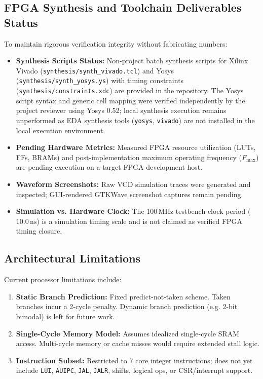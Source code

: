 \documentclass[conference]{IEEEtran}
\begin{document}
\subsection{FPGA Synthesis and Toolchain Deliverables Status}
To maintain rigorous verification integrity without fabricating numbers:
\begin{itemize}
    \item \textbf{Synthesis Scripts Status:} Non-project batch synthesis scripts for Xilinx Vivado (\texttt{synthesis/synth\_vivado.tcl}) and Yosys (\texttt{synthesis/synth\_yosys.ys}) with timing constraints (\texttt{synthesis/constraints.xdc}) are provided in the repository. The Yosys script syntax and generic cell mapping were verified independently by the project reviewer using Yosys 0.52; local synthesis execution remains unperformed as EDA synthesis tools (\texttt{yosys}, \texttt{vivado}) are not installed in the local execution environment.
    \item \textbf{Pending Hardware Metrics:} Measured FPGA resource utilization (LUTs, FFs, BRAMs) and post-implementation maximum operating frequency ($F_{\max}$) are pending execution on a target FPGA development host.
    \item \textbf{Waveform Screenshots:} Raw VCD simulation traces were generated and inspected; GUI-rendered GTKWave screenshot captures remain pending.
    \item \textbf{Simulation vs. Hardware Clock:} The 100\,MHz testbench clock period ($10.0\,\text{ns}$) is a simulation timing scale and is not claimed as verified FPGA timing closure.
\end{itemize}

\subsection{Architectural Limitations}
Current processor limitations include:
\begin{enumerate}
    \item \textbf{Static Branch Prediction:} Fixed predict-not-taken scheme. Taken branches incur a 2-cycle penalty. Dynamic branch prediction (e.g. 2-bit bimodal) is left for future work.
    \item \textbf{Single-Cycle Memory Model:} Assumes idealized single-cycle SRAM access. Multi-cycle memory or cache misses would require extended stall logic.
    \item \textbf{Instruction Subset:} Restricted to 7 core integer instructions; does not yet include \texttt{LUI}, \texttt{AUIPC}, \texttt{JAL}, \texttt{JALR}, shifts, logical ops, or CSR/interrupt support.
\end{enumerate}
\end{document}
